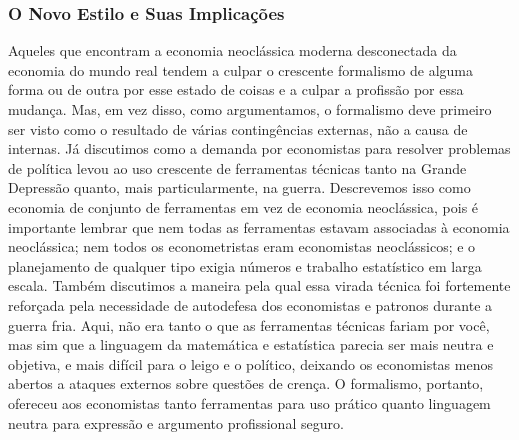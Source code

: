 \documentclass[a4paper,12pt]{article}[abntex2]
\begin{document}
\subsubsection{\textbf{O Novo Estilo e Suas Implicações}}

Aqueles que encontram a economia neoclássica moderna desconectada da economia do mundo real tendem a culpar o crescente formalismo de alguma forma ou de outra por esse estado de coisas e a culpar a profissão por essa mudança. Mas, em vez disso, como argumentamos, o formalismo deve primeiro ser visto como o resultado de várias contingências externas, não a causa de internas. Já discutimos como a demanda por economistas para resolver problemas de política levou ao uso crescente de ferramentas técnicas tanto na Grande Depressão quanto, mais particularmente, na guerra. Descrevemos isso como economia de conjunto de ferramentas em vez de economia neoclássica, pois é importante lembrar que nem todas as ferramentas estavam associadas à economia neoclássica; nem todos os econometristas eram economistas neoclássicos; e o planejamento de qualquer tipo exigia números e trabalho estatístico em larga escala. Também discutimos a maneira pela qual essa virada técnica foi fortemente reforçada pela necessidade de autodefesa dos economistas e patronos durante a guerra fria. Aqui, não era tanto o que as ferramentas técnicas fariam por você, mas sim que a linguagem da matemática e estatística parecia ser mais neutra e objetiva, e mais difícil para o leigo e o político, deixando os economistas menos abertos a ataques externos sobre questões de crença. O formalismo, portanto, ofereceu aos economistas tanto ferramentas para uso prático quanto linguagem neutra para expressão e argumento profissional seguro.
\end{document}
